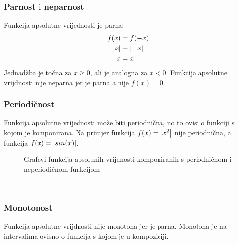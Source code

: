 \subsubsection{Parnost i neparnost \aps}
    Funkcija apsolutne vrijednosti je parna:
    \begin{equation*}
        \begin{split}
            f(x) &= f(-x) \\
            \abs{x} &= \abs{-x}  \\
            x &= x
        \end{split}
    \end{equation*}
    Jednadžba je točna za \(x \geq 0\), ali je analogna za \(x < 0\).
    Funkcija apsolutne vrijdnosti nije neparna jer je parna a nije \(f(x) = 0\).

\subsubsection{Periodičnost \aps}
    Funkcija apsolutne vrijednosti može biti periodnična, no to ovisi o funkciji s kojom je komponirana.
    Na primjer funkcija \(f(x) = \abs{x^2}\) nije periodnična, a funkcija \(f(x) = \abs{sin(x)}\).
    \begin{figure}[ht]
        \centering
        \caption{Grafovi funkcija apsolunih vrijdnosti komponiranih s periodničnom i neperiodičnom funkcijom}
        \label{fig:template}
    \end{figure}
    \\
\subsubsection{Monotonost \aps}
    Funkcija apsolutne vrijdnosti nije monotona jer je parna.
    Monotona je na intervalima ovisno o funkcija s kojom je u kompoziciji.

